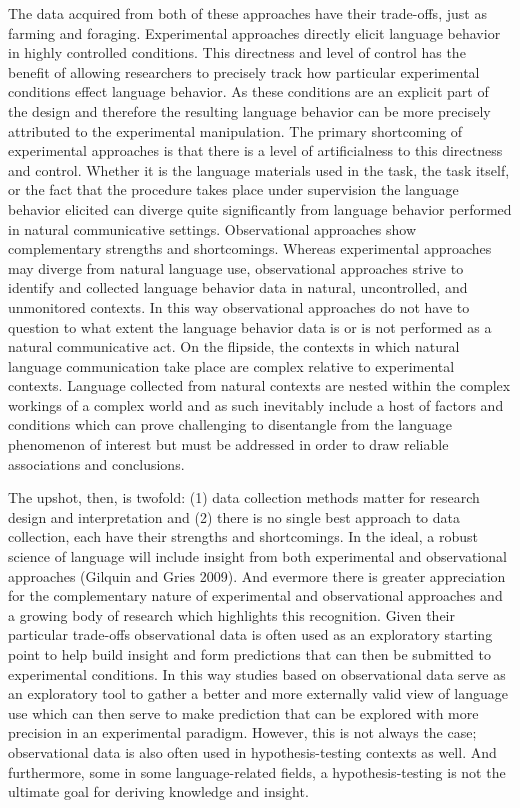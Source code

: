 \documentclass[
  letterpaper,
]{scrbook}
\begin{document}
The data acquired from both of these approaches have their trade-offs,
just as farming and foraging. Experimental approaches directly elicit
language behavior in highly controlled conditions. This directness and
level of control has the benefit of allowing researchers to precisely
track how particular experimental conditions effect language behavior.
As these conditions are an explicit part of the design and therefore the
resulting language behavior can be more precisely attributed to the
experimental manipulation. The primary shortcoming of experimental
approaches is that there is a level of artificialness to this directness
and control. Whether it is the language materials used in the task, the
task itself, or the fact that the procedure takes place under
supervision the language behavior elicited can diverge quite
significantly from language behavior performed in natural communicative
settings. Observational approaches show complementary strengths and
shortcomings. Whereas experimental approaches may diverge from natural
language use, observational approaches strive to identify and collected
language behavior data in natural, uncontrolled, and unmonitored
contexts. In this way observational approaches do not have to question
to what extent the language behavior data is or is not performed as a
natural communicative act. On the flipside, the contexts in which
natural language communication take place are complex relative to
experimental contexts. Language collected from natural contexts are
nested within the complex workings of a complex world and as such
inevitably include a host of factors and conditions which can prove
challenging to disentangle from the language phenomenon of interest but
must be addressed in order to draw reliable associations and
conclusions.

The upshot, then, is twofold: (1) data collection methods matter for
research design and interpretation and (2) there is no single best
approach to data collection, each have their strengths and shortcomings.
In the ideal, a robust science of language will include insight from
both experimental and observational approaches (Gilquin and Gries 2009).
And evermore there is greater appreciation for the complementary nature
of experimental and observational approaches and a growing body of
research which highlights this recognition. Given their particular
trade-offs observational data is often used as an exploratory starting
point to help build insight and form predictions that can then be
submitted to experimental conditions. In this way studies based on
observational data serve as an exploratory tool to gather a better and
more externally valid view of language use which can then serve to make
prediction that can be explored with more precision in an experimental
paradigm. However, this is not always the case; observational data is
also often used in hypothesis-testing contexts as well. And furthermore,
some in some language-related fields, a hypothesis-testing is not the
ultimate goal for deriving knowledge and insight.
\end{document}
